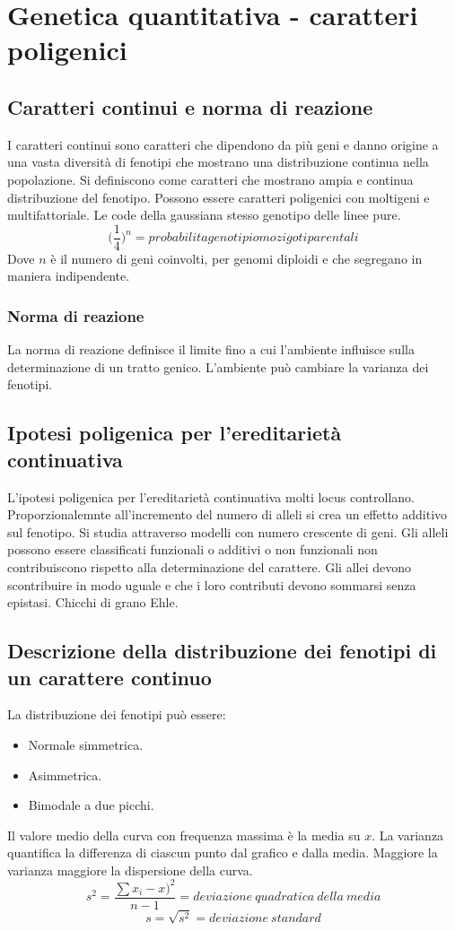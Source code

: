 \chapter{Genetica quantitativa - caratteri poligenici}

\section{Caratteri continui e norma di reazione}
I caratteri continui sono caratteri che dipendono da pi\`u geni e danno origine a una vasta diversit\`a di fenotipi che mostrano una distribuzione continua nella popolazione.
Si definiscono come caratteri che mostrano ampia e continua distribuzione del fenotipo.
Possono essere caratteri poligenici con moltigeni e multifattoriale.
Le code della gaussiana stesso genotipo delle linee pure.
\[\biggl(\dfrac{1}{4}\biggr)^n = probabilita genotipi omozigoti parentali\]
Dove $n$ \`e il numero di geni coinvolti, per genomi diploidi e che segregano in maniera indipendente.

	\subsection{Norma di reazione}
	La norma di reazione definisce il limite fino a cui l'ambiente influisce sulla determinazione di un tratto genico.
	L'ambiente pu\`o cambiare la varianza dei fenotipi.

\section{Ipotesi poligenica per l'ereditariet\`a continuativa}
L'ipotesi poligenica per l'ereditariet\`a continuativa molti locus controllano.
Proporzionalemnte all'incremento del numero di alleli si crea un effetto additivo sul fenotipo.
Si studia attraverso modelli con numero crescente di geni.
Gli alleli possono essere classificati funzionali o additivi o non funzionali non contribuiscono rispetto alla determinazione del carattere.
Gli allei devono scontribuire in modo uguale e che i loro contributi devono sommarsi senza epistasi.
Chicchi di grano Ehle.

\section{Descrizione della distribuzione dei fenotipi di un carattere continuo}
La distribuzione dei fenotipi pu\`o essere:
\begin{itemize}
	\item Normale simmetrica.
	\item Asimmetrica.
	\item Bimodale a due picchi.
\end{itemize}
Il valore medio della curva con frequenza massima \`e la media su $x$.
La varianza quantifica la differenza di ciascun punto dal grafico e dalla media.
Maggiore la varianza maggiore la dispersione della curva.
\[s^2=\dfrac{\sum x_i - x)^2}{n-1}=deviazione\ quadratica\ della\ media\]
\[ s = \sqrt{s^2} = deviazione\ standard\]

